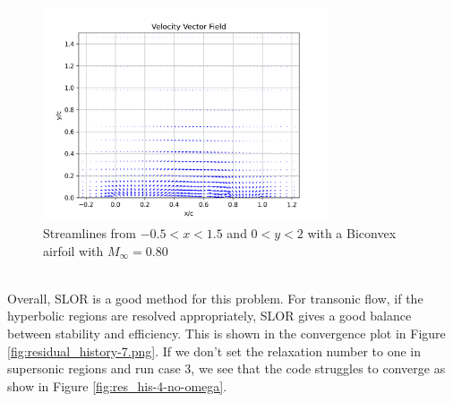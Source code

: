 \documentclass[12pt]{article}
\theoremstyle{definition}
\begin{document}
\begin{figure}
    \centering
    \includegraphics[width=0.75\textwidth,height=\textwidth,keepaspectratio]{images/velocity_vectors-5.png}
    \caption{Streamlines from $-0.5 < x < 1.5$ and $0 < y <2$ with a Biconvex airfoil with $M_\infty = 0.80$}
    \label{fig:velocity_vectors-5}
\end{figure}



\vspace{1cm}



\\
Overall, SLOR is a good method for this problem. For transonic flow, if the hyperbolic regions are resolved appropriately, SLOR gives a good balance between stability and efficiency. This is shown in the convergence plot in Figure \ref{fig:residual_history-7.png}. If we don't set the relaxation number to one in supersonic regions and run case 3, we see that the code struggles to converge as show in Figure \ref{fig:res_his-4-no-omega}.
\end{document}
